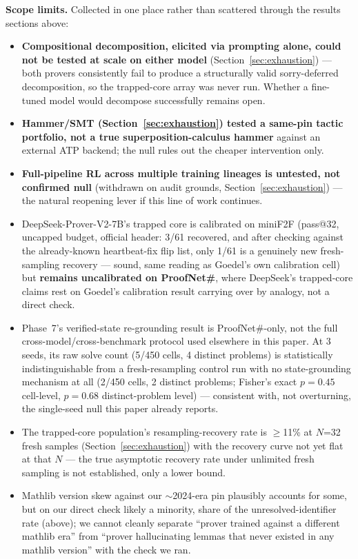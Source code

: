 \documentclass{article}
\begin{document}
\textbf{Scope limits.} Collected in one place rather than scattered through the results sections above:
\begin{itemize}
  \item \textbf{Compositional decomposition, elicited via prompting alone, could not be tested at
    scale on either model} (Section~\ref{sec:exhaustion}) --- both provers consistently fail to produce
    a structurally valid sorry-deferred decomposition, so the trapped-core array was never run. Whether
    a fine-tuned model would decompose successfully remains open.
  \item \textbf{Hammer/SMT (Section~\ref{sec:exhaustion}) tested a same-pin tactic portfolio, not a
    true superposition-calculus hammer} against an external ATP backend; the null rules out the cheaper
    intervention only.
  \item \textbf{Full-pipeline RL across multiple training lineages is untested, not confirmed null}
    (withdrawn on audit grounds, Section~\ref{sec:exhaustion}) --- the natural reopening lever if this
    line of work continues.
  \item DeepSeek-Prover-V2-7B's trapped core is calibrated on miniF2F (pass@32, uncapped budget,
    official header: 3/61 recovered, and after checking against the already-known heartbeat-fix flip
    list, only 1/61 is a genuinely new fresh-sampling recovery --- sound, same reading as Goedel's own
    calibration cell) but \textbf{remains uncalibrated on ProofNet\#}, where DeepSeek's trapped-core
    claims rest on Goedel's calibration result carrying over by analogy, not a direct check.
  \item Phase~7's verified-state re-grounding result is ProofNet\#-only, not the full
    cross-model/cross-benchmark protocol used elsewhere in this paper. At 3 seeds, its raw solve count
    (5/450 cells, 4 distinct problems) is statistically indistinguishable from a fresh-resampling
    control run with no state-grounding mechanism at all (2/450 cells, 2 distinct problems; Fisher's
    exact $p=0.45$ cell-level, $p=0.68$ distinct-problem level) --- consistent with, not overturning,
    the single-seed null this paper already reports.
  \item The trapped-core population's resampling-recovery rate is $\geq$11\% at $N$=32 fresh samples
    (Section~\ref{sec:exhaustion}) with the recovery curve not yet flat at that $N$ --- the true
    asymptotic recovery rate under unlimited fresh sampling is not established, only a lower bound.
  \item Mathlib version skew against our $\sim$2024-era pin plausibly accounts for some, but on our
    direct check likely a minority, share of the unresolved-identifier rate (above); we cannot cleanly
    separate ``prover trained against a different mathlib era'' from ``prover hallucinating lemmas that
    never existed in any mathlib version'' with the check we ran.
\end{itemize}
\end{document}
